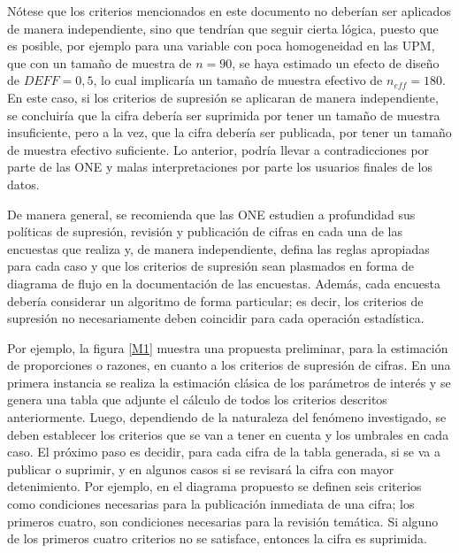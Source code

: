 \documentclass[
  12pt,
  spanish,
]{book}
\begin{document}
Nótese que los criterios mencionados en este documento no deberían ser aplicados de manera independiente, sino que tendrían que seguir cierta lógica, puesto que es posible, por ejemplo para una variable con poca homogeneidad en las UPM, que con un tamaño de muestra de \(n=90\), se haya estimado un efecto de diseño de \(DEFF=0,5\), lo cual implicaría un tamaño de muestra efectivo de \(n_{eff}=180\). En este caso, si los criterios de supresión se aplicaran de manera independiente, se concluiría que la cifra debería ser suprimida por tener un tamaño de muestra insuficiente, pero a la vez, que la cifra debería ser publicada, por tener un tamaño de muestra efectivo suficiente. Lo anterior, podría llevar a contradicciones por parte de las ONE y malas interpretaciones por parte los usuarios finales de los datos.

De manera general, se recomienda que las ONE estudien a profundidad sus políticas de supresión, revisión y publicación de cifras en cada una de las encuestas que realiza y, de manera independiente, defina las reglas apropiadas para cada caso y que los criterios de supresión sean plasmados en forma de diagrama de flujo en la documentación de las encuestas. Además, cada encuesta debería considerar un algoritmo de forma particular; es decir, los criterios de supresión no necesariamente deben coincidir para cada operación estadística.

Por ejemplo, la figura \ref{M1} muestra una propuesta preliminar, para la estimación de proporciones o razones, en cuanto a los criterios de supresión de cifras. En una primera instancia se realiza la estimación clásica de los parámetros de interés y se genera una tabla que adjunte el cálculo de todos los criterios descritos anteriormente. Luego, dependiendo de la naturaleza del fenómeno investigado, se deben establecer los criterios que se van a tener en cuenta y los umbrales en cada caso. El próximo paso es decidir, para cada cifra de la tabla generada, si se va a publicar o suprimir, y en algunos casos si se revisará la cifra con mayor detenimiento. Por ejemplo, en el diagrama propuesto se definen seis criterios como condiciones necesarias para la publicación inmediata de una cifra; los primeros cuatro, son condiciones necesarias para la revisión temática. Si alguno de los primeros cuatro criterios no se satisface, entonces la cifra es suprimida.
\end{document}
